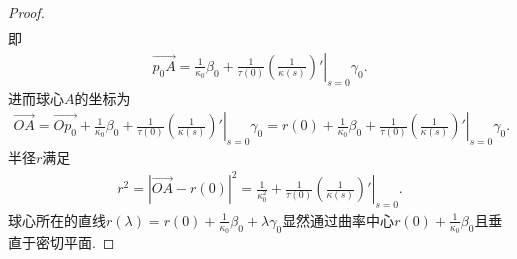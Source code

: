 \documentclass[../../main.tex]{subfiles}%
\begin{document}
\begin{proof}
\begin{align*}
\end{align*}
即
\begin{align*}
\overrightarrow{p_0A}=\frac{1}{\kappa _0}\beta _0+\frac{1}{\tau \left( 0 \right)}\left. \left( \frac{1}{\kappa \left( s \right)} \right) ' \right|_{s=0}\gamma _0.
\end{align*}
进而球心$A$的坐标为
\begin{align*}
\overrightarrow{OA}=\overrightarrow{Op_0}+\frac{1}{\kappa _0}\beta _0+\frac{1}{\tau \left( 0 \right)}\left. \left( \frac{1}{\kappa \left( s \right)} \right) ' \right|_{s=0}\gamma _0=r\left( 0 \right) + \frac{1}{\kappa _0}\beta _0+\frac{1}{\tau \left( 0 \right)}\left. \left( \frac{1}{\kappa \left( s \right)} \right) ' \right|_{s=0}\gamma _0.
\end{align*}
半径$r$满足
\begin{align*}
r^2=|\overrightarrow{OA}-r(0)|^2=\frac{1}{\kappa _{0}^{2}}+\frac{1}{\tau \left( 0 \right)}\left. \left( \frac{1}{\kappa \left( s \right)} \right) \prime \right|_{s=0}.
\end{align*}
球心所在的直线$r(\lambda)=r(0)+\frac{1}{\kappa_0}\beta_0+\lambda\gamma_0$显然通过曲率中心$r(0)+\frac{1}{\kappa_0}\beta_0$且垂直于密切平面.

\end{proof}
\end{document}
